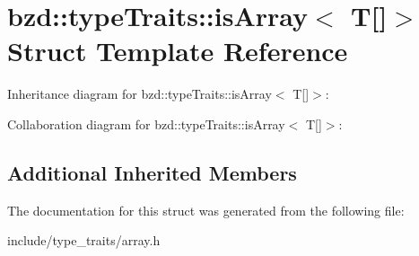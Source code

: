 \hypertarget{structbzd_1_1typeTraits_1_1isArray_3_01T[]_4}{}\section{bzd\+:\+:type\+Traits\+:\+:is\+Array$<$ T\mbox{[}\mbox{]}$>$ Struct Template Reference}
\label{structbzd_1_1typeTraits_1_1isArray_3_01T[]_4}


Inheritance diagram for bzd\+:\+:type\+Traits\+:\+:is\+Array$<$ T\mbox{[}\mbox{]}$>$\+:


Collaboration diagram for bzd\+:\+:type\+Traits\+:\+:is\+Array$<$ T\mbox{[}\mbox{]}$>$\+:
\subsection*{Additional Inherited Members}


The documentation for this struct was generated from the following file\+:\begin{DoxyCompactItemize}
\item 
include/type\+\_\+traits/array.\+h\end{DoxyCompactItemize}
